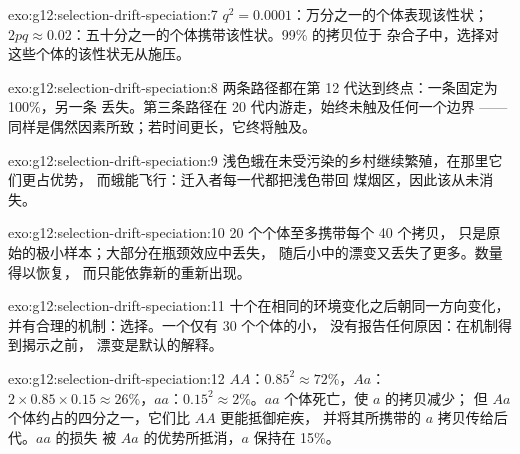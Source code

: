 \begin{solution}{exo:g12:selection-drift-speciation:7}
$q^2 = 0.0001$：万分之一的个体表现该性状；$2pq \approx
0.02$：五十分之一的个体携带该性状。99\% 的拷贝位于
杂合子中，选择对这些个体的该性状无从施压。
\end{solution}

\begin{solution}{exo:g12:selection-drift-speciation:8}
两条路径都在第 12 代达到终点：一条固定为 100\%，另一条
丢失。第三条路径在 20 代内游走，始终未触及任何一个边界
——同样是偶然因素所致；若时间更长，它终将触及。
\end{solution}

\begin{solution}{exo:g12:selection-drift-speciation:9}
浅色蛾在未受污染的乡村继续繁殖，在那里它们更占优势，
而蛾能飞行：迁入者每一代都把浅色带回
煤烟区，因此该从未消失。
\end{solution}

\begin{solution}{exo:g12:selection-drift-speciation:10}
20 个个体至多携带每个 40 个拷贝，
只是原始的极小样本；大部分在瓶颈效应中丢失，
随后小中的漂变又丢失了更多。数量得以恢复，
而只能依靠新的重新出现。
\end{solution}

\begin{solution}{exo:g12:selection-drift-speciation:11}
十个在相同的环境变化之后朝同一方向变化，
并有合理的机制：选择。一个仅有 30 个个体的小，
没有报告任何原因：在机制得到揭示之前，
漂变是默认的解释。
\end{solution}

\begin{solution}{exo:g12:selection-drift-speciation:12}
$AA$：$0.85^2 \approx 72\%$，$Aa$：$2 \times 0.85 \times 0.15 \approx
26\%$，$aa$：$0.15^2 \approx 2\%$。$aa$ 个体死亡，使 $a$ 的拷贝减少；
但 $Aa$ 个体约占的四分之一，它们比 $AA$ 更能抵御疟疾，
并将其所携带的 $a$ 拷贝传给后代。$aa$ 的损失
被 $Aa$ 的优势所抵消，$a$ 保持在 15\%。
\end{solution}

